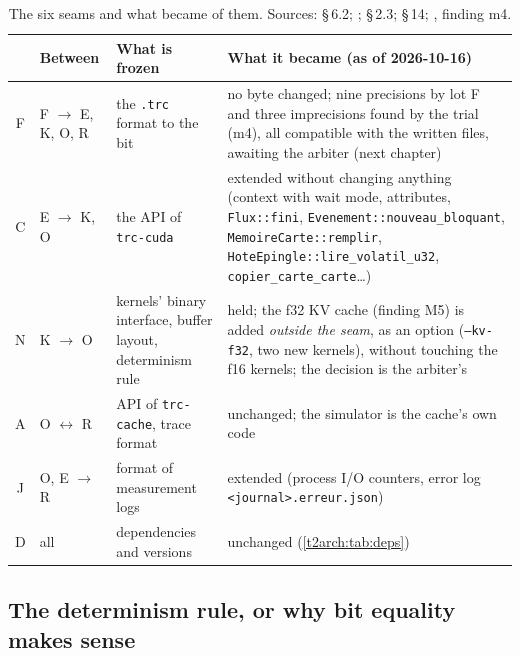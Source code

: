 \begin{table}[ht]
\centering\small
\begin{tabularx}{\linewidth}{c l >{\raggedright\arraybackslash}X >{\raggedright\arraybackslash}X}
\toprule
& Between & What is frozen & What it became (as of 2026-10-16) \\
\midrule
F & F $\to$ E, K, O, R & the \texttt{.trc} format to the bit & no byte changed; nine precisions by lot F and three imprecisions found by the trial (m4), all compatible with the written files, awaiting the arbiter (next chapter) \\
C & E $\to$ K, O & the API of \texttt{trc-cuda} & extended without changing anything (context with wait mode, attributes, \texttt{Flux::fini}, \texttt{Evenement::nouveau\_bloquant}, \texttt{MemoireCarte::remplir}, \texttt{HoteEpingle::\allowbreak lire\_volatil\_u32}, \texttt{copier\_carte\_carte}…) \\
N & K $\to$ O & kernels' binary interface, buffer layout, determinism rule & held; the f32 KV cache (finding M5) is added \emph{outside the seam}, as an option (\texttt{--kv-f32}, two new kernels), without touching the f16 kernels; the decision is the arbiter's \\
A & O $\leftrightarrow$ R & API of \texttt{trc-cache}, trace format & unchanged; the simulator is the cache's own code \\
J & O, E $\to$ R & format of measurement logs & extended (process I/O counters, error log \texttt{<journal>.erreur.json}) \\
D & all & dependencies and versions & unchanged (\cref{t2arch:tab:deps}) \\
\bottomrule
\end{tabularx}
\caption[The seams and their history]{The six seams and what became of them. Sources:  §\,6.2; ;  §\,2.3;  §\,14; , finding m4.}
\label{t2arch:tab:coutures}
\end{table}

\subsection{The determinism rule, or why bit equality makes sense}

